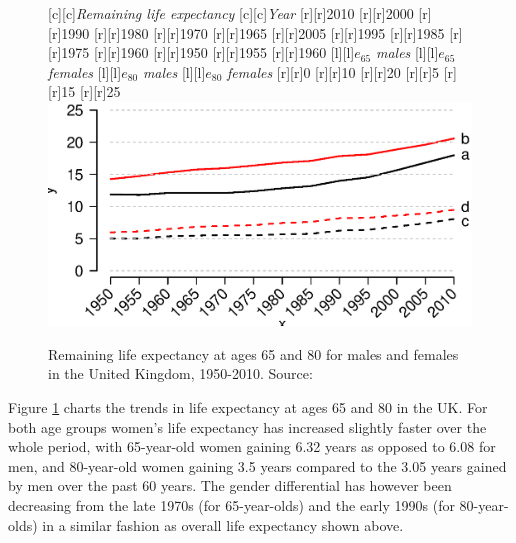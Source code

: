 \documentclass[11 pt, a4paper]{report}
\begin{document}
\begin{figure}[hbtp!]
[c][c]{\small{\emph{Remaining life expectancy}}}
[c][c]{\small{\emph{Year}}}
[r][r]{\small{2010}}
[r][r]{\small{2000}}
[r][r]{\small{1990}}
[r][r]{\small{1980}}
[r][r]{\small{1970}}
[r][r]{\small{1965}}
[r][r]{\small{2005}}
[r][r]{\small{1995}}
[r][r]{\small{1985}}
[r][r]{\small{1975}}
[r][r]{\small{1960}}
[r][r]{\small{1950}}
[r][r]{\small{1955}}
[r][r]{\small{1960}}
[l][l]{$e_{65}$ \emph{males}}
[l][l]{$e_{65}$ \emph{females}}
[l][l]{$e_{80}$ \emph{males}}
[l][l]{$e_{80}$ \emph{females}}
[r][r]{\small{0}}
[r][r]{\small{10}}
[r][r]{\small{20}}
[r][r]{\small{5}}
[r][r]{\small{15}}
[r][r]{\small{25}}
\includegraphics[width=\textwidth]{../figures/Fig2.2.eps}
\caption{Remaining life expectancy at ages 65 and 80 for males and females in the United Kingdom, 1950-2010. Source:  \cite{HMD2015}}
\label{Fig:08}
\end{figure}

Figure \ref{Fig:08} charts the trends in life expectancy at ages 65 and 80 in the UK. For both age groups women's life expectancy has increased slightly faster over the whole period, with 65-year-old women gaining  6.32 years as opposed to 6.08 for men, and 80-year-old women gaining  3.5 years compared to the 3.05 years gained by men over the past 60 years. The gender differential has however been decreasing from the late 1970s (for 65-year-olds) and the early 1990s (for 80-year-olds) in a similar fashion as overall life expectancy shown above. 
\end{document}
